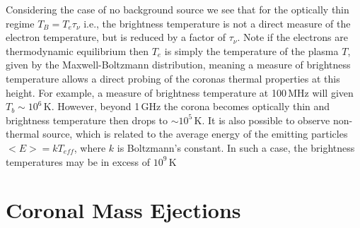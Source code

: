 Considering the case of no background source we see that for the optically thin regime $T_B = T_e\tau_{\nu}$ i.e., the brightness temperature is not a direct measure of the electron temperature, but is reduced by a factor of $\tau_{\nu}$. Note if the electrons are thermodynamic equilibrium then $T_e$ is simply the temperature of the plasma $T$, given by the Maxwell-Boltzmann distribution, meaning  a measure of brightness temperature allows a direct probing of the coronas thermal properties at this height. For example, a measure of brightness temperature at 100\,MHz will given $T_b\sim10^6$\,K. However, beyond 1\,GHz the corona becomes optically thin and brightness temperature then drops to $\sim10^{5}$\,K. It is also possible to observe non-thermal source, which is related to the average energy of the emitting particles $<E>=kT_{eff}$, where $k$ is Boltzmann's constant. In such a case, the brightness temperatures may be in excess of $10^{9}$\,K





\section{Coronal Mass Ejections}\label{sec:2}

